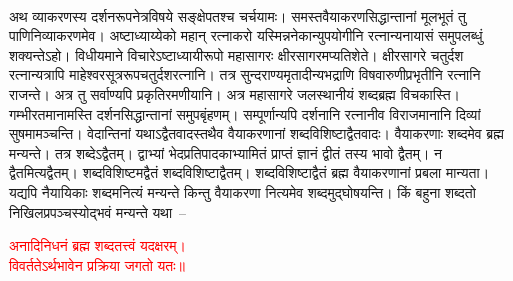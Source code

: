 \\
\begin{sloppypar}\justifying\noindent\hspace{10mm} अथ व्याकरणस्य दर्शन\-रूप\-नेत्र\-विषये सङ्क्षेपतश्च चर्चयामः। समस्त\-वैयाकरण\-सिद्धान्तानां मूल\-भूतं तु पाणिनि\-व्याकरणमेव। अष्टाध्याय्येको महान् रत्नाकरो यस्मिन्ननेकान्युपयोगीनि रत्नान्यनायासं समुपलब्धुं शक्यन्तेऽहो। विधीयमाने विचारेऽष्टाध्यायी\-रूपो महा\-सागरः क्षीर\-सागरमप्यतिशेते। क्षीर\-सागरे चतुर्दश रत्नान्यत्रापि माहेश्वर\-सूत्र\-रूप\-चतुर्दश\-रत्नानि। तत्र सुन्दराण्यमृतादीन्यभद्राणि विष\-वारुणी\-प्रभृतीनि रत्नानि राजन्ते। अत्र तु सर्वाण्यपि प्रकृति\-रमणीयानि। अत्र महा\-सागरे जल\-स्थानीयं शब्द\-ब्रह्म विचकास्ति। गम्भीरतमानामस्ति दर्शन\-सिद्धान्तानां समुपबृंहणम्। सम्पूर्णान्यपि दर्शनानि रत्नानीव विराजमानानि दिव्यां सुषमामञ्चन्ति। वेदान्तिनां यथाऽद्वैत\-वादस्तथैव वैयाकरणानां शब्द\-विशिष्टाद्वैत\-वादः। वैयाकरणाः शब्दमेव ब्रह्म मन्यन्ते। तत्र शब्देऽद्वैतम्। द्वाभ्यां भेद\-प्रतिपादकाभ्यामितं प्राप्तं ज्ञानं द्वीतं तस्य भावो द्वैतम्। न द्वैतमित्यद्वैतम्। शब्द\-विशिष्टमद्वैतं शब्द\-विशिष्टाद्वैतम्। शब्द\-विशिष्टाद्वैतं ब्रह्म वैयाकरणानां प्रबला मान्यता। यद्यपि नैयायिकाः शब्दमनित्यं मन्यन्ते किन्तु वैयाकरणा नित्यमेव शब्दमुद्घोषयन्ति। किं बहुना शब्दतो निखिल\-प्रपञ्चस्योद्भवं मन्यन्ते यथा~–\end{sloppypar}
\centering\textcolor{red}{अनादिनिधनं ब्रह्म शब्दतत्त्वं यदक्षरम्।\nopagebreak\\
विवर्ततेऽर्थभावेन प्रक्रिया जगतो यतः॥}\nopagebreak\\
\\
